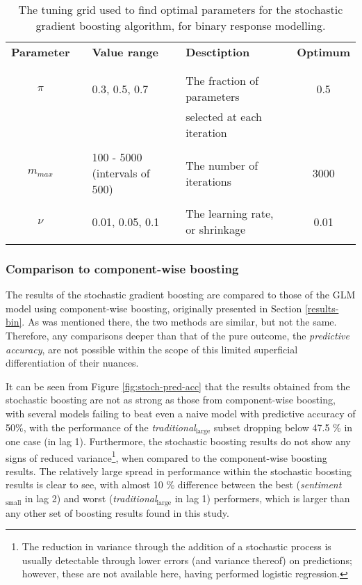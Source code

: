 \documentclass{article}
\begin{document}
\begin{table}[htb]
\centering
\begin{tabular}{clllllc}
\textbf{Parameter} &  & \textbf{Value range} &  & \textbf{Desctiption} &  & \textbf{Optimum}\\
 &  &  &  &  &  & \\
\hline
 &  &  &  &  &  & \\
$\pi$ &  & 0.3, 0.5, 0.7 &  & The fraction of parameters &  & 0.5\\
 &  &  &  & selected at each iteration &  & \\
 &  &  &  &  &  & \\
$m_{max}$ &  & 100 - 5000 (intervals of 500) &  & The number of iterations &  & 3000\\
 &  &  &  &  &  & \\
$\nu$ &  & 0.01, 0.05, 0.1 &  & The learning rate, or shrinkage &  & 0.01\\
 &  &  &  &  &  & \\
\end{tabular}\caption[The tuning grid optimised over for stochastic gradient boosting]{\label{tab:tuning-grid}The tuning grid used to find optimal parameters for the stochastic gradient boosting algorithm, for binary response modelling.}

\end{table}


\subsubsection{Comparison to component-wise boosting}
\label{sec-1-5-2}

The results of the stochastic gradient boosting are compared to those of the GLM model using component-wise boosting, originally presented in Section \ref{results-bin}. As was mentioned there, the two methods are similar, but not the same. Therefore, any comparisons deeper than that of the pure outcome, the \emph{predictive accuracy}, are not possible within the scope of this limited superficial differentiation of their nuances.

It can be seen from Figure \ref{fig:stoch-pred-acc} that the results obtained from the stochastic boosting are not as strong as those from component-wise boosting, with several models failing to beat even a naive model with predictive accuracy of 50\%, with the performance of the \emph{traditional$_{\text{large}}$} subset dropping below 47.5 \% in one case (in lag 1). Furthermore, the stochastic boosting results do not show any signs of reduced variance\footnote{The reduction in variance through the addition of a stochastic process is usually detectable through lower errors (and variance thereof) on predictions; however, these are not available here, having performed logistic regression.}, when compared to the component-wise boosting results. The relatively large spread in performance within the stochastic boosting results is clear to see, with almost 10 \% difference between the best (\emph{sentiment$_{\text{small}}$} in lag 2) and worst (\emph{traditional$_{\text{large}}$} in lag 1) performers, which is larger than any other set of boosting results found in this study.
\end{document}
